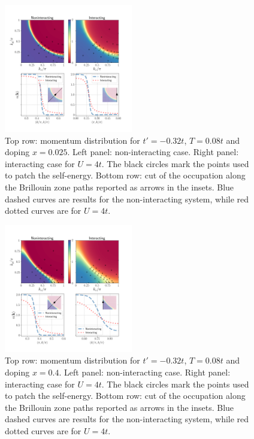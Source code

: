 \begin{figure}
\includegraphics[width=0.5\textwidth]{images/occupations_0975.png}
\caption{Top row: momentum distribution for $t'=-0.32t$, $T=0.08t$ and doping $x=0.025$. Left panel: non-interacting case. Right panel: interacting case for $U=4t$. The black circles mark the points used to patch the self-energy.
Bottom row: cut of the occupation along the Brillouin zone paths reported as arrows in the insets. Blue dashed curves are results for the non-interacting system, while red dotted curves are for $U=4t$. } 
\label{fig:occ975}
\end{figure}

\begin{figure}
\includegraphics[width=0.5\textwidth]{images/occupations_0600.png}
\caption{Top row: momentum distribution for $t'=-0.32t$, $T=0.08t$ and doping $x=0.4$. Left panel: non-interacting case. Right panel: interacting case for $U=4t$. The black circles mark the points used to patch the self-energy.
Bottom row: cut of the occupation along the Brillouin zone paths reported as arrows in the insets. Blue dashed curves are results for the non-interacting system, while red dotted curves are for $U=4t$. }
\label{fig:occ600}
\end{figure}


